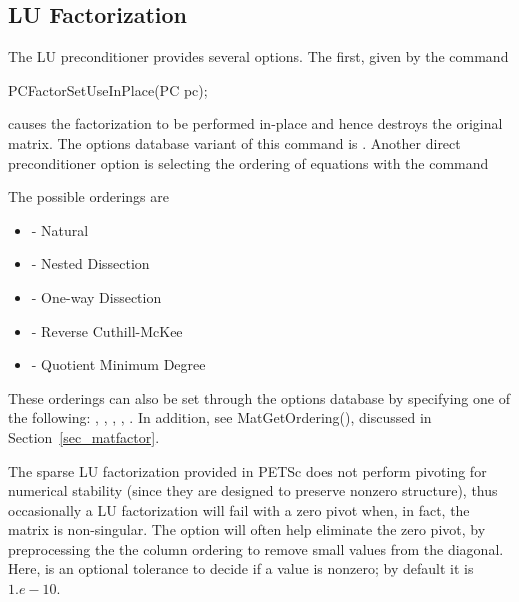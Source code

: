 \subsection{LU Factorization}
\label{sec_factorization}

The LU preconditioner provides several options.  The first, given by
the 
command  
\begin{tabbing}
  PCFactorSetUseInPlace(PC pc);
\end{tabbing}
causes the factorization to be performed in-place and hence
destroys the original matrix.  The options database variant of
this command is . 
Another direct preconditioner option is selecting the ordering
of equations with the command  
\begin{tabbing}
\end{tabbing}
The possible orderings are
\begin{itemize}
\item {} - Natural
\item {} - Nested Dissection
\item {} - One-way Dissection
\item {} - Reverse Cuthill-McKee
\item {} - Quotient Minimum Degree
\end{itemize}
  
  
  
 
These orderings can also be set through the options database by specifying 
one of the following:   , 
,  ,  ,
 .
In addition, see 
\break MatGetOrdering(), discussed in Section~\ref{sec_matfactor}.

The sparse LU factorization provided in PETSc does not perform pivoting for 
numerical stability (since they are designed to preserve nonzero 
structure), thus occasionally a LU factorization will fail with a zero 
pivot when, in fact, the matrix is non-singular. The option
 
will often help eliminate the zero pivot, by preprocessing the the 
column ordering to remove small values from the diagonal. Here, 
is an optional tolerance to decide if a value is nonzero; by default it
is $ 1.e-10.$ 


